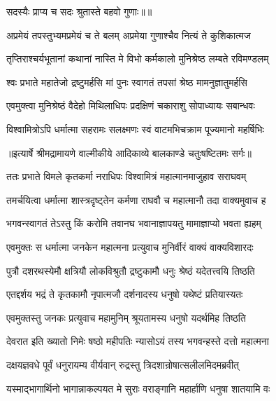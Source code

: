 {सदस्यैः प्राप्य च सदः श्रुतास्ते बहवो गुणाः॥॥} %

\addtocounter{shlokacount}{1}

\twolineshloka
{अप्रमेयं तपस्तुभ्यमप्रमेयं च ते बलम्}
{अप्रमेया गुणाश्चैव नित्यं ते कुशिकात्मज} %

\twolineshloka
{तृप्तिराश्चर्यभूतानां कथानां नास्ति मे विभो}
{कर्मकालो मुनिश्रेष्ठ लम्बते रविमण्डलम्} %

\twolineshloka
{श्वः प्रभाते महातेजो द्रष्टुमर्हसि मां पुनः}
{स्वागतं तपसां श्रेष्ठ मामनुज्ञातुमर्हसि} %

\twolineshloka
{एवमुक्त्वा मुनिश्रेष्ठं वैदेहो मिथिलाधिपः}
{प्रदक्षिणं चकाराशु सोपाध्यायः सबान्धवः} %

\twolineshloka
{विश्वामित्रोऽपि धर्मात्मा सहरामः सलक्ष्मणः}
{स्वं वाटमभिचक्राम पूज्यमानो महर्षिभिः} %


{॥इत्यार्षे श्रीमद्रामायणे वाल्मीकीये आदिकाव्ये बालकाण्डे चतुःषष्टितमः सर्गः॥}


\twolineshloka
{ततः प्रभाते विमले कृतकर्मा नराधिपः}
{विश्वामित्रं महात्मानमाजुहाव सराघवम्} %

\twolineshloka
{तमर्चयित्वा धर्मात्मा शास्त्रदृष्ट्तेन कर्मणा}
{राघवौ च महात्मानौ तदा वाक्यमुवाच ह} %

\twolineshloka
{भगवन्स्वागतं तेऽस्तु किं करोमि तवानघ}
{भवानाज्ञापयतु मामाज्ञाप्यो भवता ह्यहम्} %

\twolineshloka
{एवमुक्तः स धर्मात्मा जनकेन महात्मना}
{प्रत्युवाच मुनिर्वीरं वाक्यं वाक्यविशारदः} %

\twolineshloka
{पुत्रौ दशरथस्येमौ क्षत्रियौ लोकविश्रुतौ}
{द्रष्टुकामौ धनुः श्रेष्ठं यदेतत्त्वयि तिष्ठति} %

\twolineshloka
{एतद्दर्शय भद्रं ते कृतकामौ नृपात्मजौ}
{दर्शनादस्य धनुषो यथेष्टं प्रतियास्यतः} %

\twolineshloka
{एवमुक्तस्तु जनकः प्रत्युवाच महामुनिम्}
{श्रूयतामस्य धनुषो यदर्थमिह तिष्ठति} %

\twolineshloka
{देवरात इति ख्यातो निमेः षष्ठो महीपतिः}
{न्यासोऽयं तस्य भगवन्हस्ते दत्तो महात्मना} %

\twolineshloka
{दक्षयज्ञवधे पूर्वं धनुरायम्य वीर्यवान्}
{रुद्रस्तु त्रिदशान्रोषात्सलीलमिदमब्रवीत्} %

\twolineshloka
{यस्माद्भागार्थिनो भागान्नाकल्पयत मे सुराः}
{वराङ्गानि महार्हाणि धनुषा शातयामि वः} %

